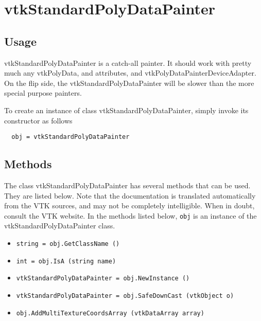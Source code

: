 \section{vtkStandardPolyDataPainter}

\subsection{Usage}

 vtkStandardPolyDataPainter is a catch-all painter.  It should work with pretty
 much any vtkPolyData, and attributes, and vtkPolyDataPainterDeviceAdapter.  On
 the flip side, the vtkStandardPolyDataPainter will be slower than the more
 special purpose painters.

To create an instance of class vtkStandardPolyDataPainter, simply
invoke its constructor as follows
\begin{verbatim}
  obj = vtkStandardPolyDataPainter
\end{verbatim}
\subsection{Methods}

The class vtkStandardPolyDataPainter has several methods that can be used.
  They are listed below.
Note that the documentation is translated automatically from the VTK sources,
and may not be completely intelligible.  When in doubt, consult the VTK website.
In the methods listed below, \verb|obj| is an instance of the vtkStandardPolyDataPainter class.
\begin{itemize}
\item  \verb|string = obj.GetClassName ()|

\item  \verb|int = obj.IsA (string name)|

\item  \verb|vtkStandardPolyDataPainter = obj.NewInstance ()|

\item  \verb|vtkStandardPolyDataPainter = obj.SafeDownCast (vtkObject o)|

\item  \verb|obj.AddMultiTextureCoordsArray (vtkDataArray array)|

\end{itemize}
